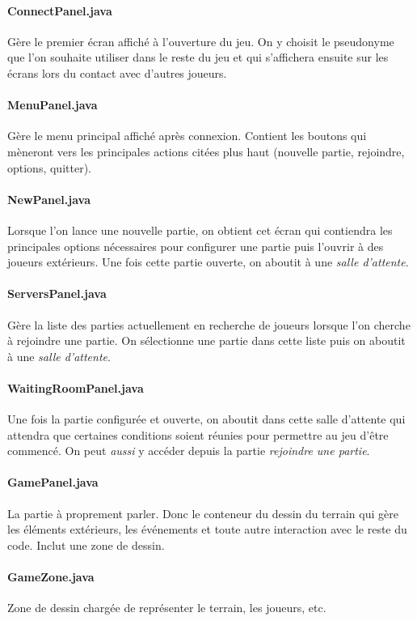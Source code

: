 \documentclass[a4paper,12pt]{report}
\begin{document}
\paragraph{ConnectPanel.java}
Gère le premier écran affiché à l'ouverture du jeu. On y choisit le pseudonyme que l'on souhaite utiliser dans le reste du jeu et qui s'affichera ensuite sur les écrans lors du contact avec d'autres joueurs.
\paragraph{MenuPanel.java}
Gère le menu principal affiché après connexion. Contient les boutons qui mèneront vers les principales actions citées plus haut (nouvelle partie, rejoindre, options, quitter).
\paragraph{NewPanel.java}
Lorsque l'on lance une nouvelle partie, on obtient cet écran qui contiendra les principales options nécessaires pour configurer une partie puis l'ouvrir à des joueurs extérieurs. Une fois cette partie ouverte, on aboutit à une \emph{salle d'attente}.
\paragraph{ServersPanel.java}
Gère la liste des parties actuellement en recherche de joueurs lorsque l'on cherche à rejoindre une partie. On sélectionne une partie dans cette liste puis on aboutit à une \emph{salle d'attente}.
\paragraph{WaitingRoomPanel.java}
Une fois la partie configurée et ouverte, on aboutit dans cette salle d'attente qui attendra que certaines conditions soient réunies pour permettre au jeu d'être commencé. On peut \emph{aussi} y accéder depuis la partie \emph{rejoindre une partie}.
\paragraph{GamePanel.java}
La partie à proprement parler. Donc le conteneur du dessin du terrain qui gère les éléments extérieurs, les événements et toute autre interaction avec le reste du code. Inclut une zone de dessin.
\paragraph{GameZone.java}
Zone de dessin chargée de représenter le terrain, les joueurs, etc.
\end{document}
